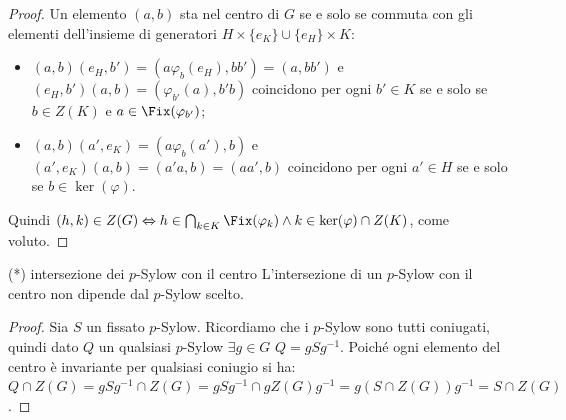 \begin{proof}
    Un elemento $(a, b)$ sta nel centro di $G$ se e solo se commuta con gli elementi dell'insieme di generatori $H \times \{e_K\} \cup \{e_H\} \times K$:
    \begin{itemize}
        \item $(a, b)(e_H, b') = (a \varphi_b(e_H), b b') = (a, b b')$ e $(e_H, b')(a, b) = (\varphi_{b'}(a), b' b)$ coincidono per ogni $b' \in K$ se e solo se $b \in Z(K)$ e $a \in \Fix(\varphi_{b'})$;
        \item $(a, b)(a', e_K) = (a \varphi_b(a'), b)$ e $(a', e_K)(a, b) = (a' a, b) = (a a', b)$ coincidono per ogni $a' \in H$ se e solo se $b \in \ker(\varphi)$.
    \end{itemize}
    Quindi $(h,k) \in Z(G) \Leftrightarrow h \in \bigcap_{k \in K} \Fix(\varphi_k) \land k \in \ker(\varphi) \cap Z(K)$, come voluto.
\end{proof}
\begin{proposition}{(*) intersezione dei $p$-Sylow con il centro}
    L'intersezione di un $p$-Sylow con il centro non dipende dal $p$-Sylow scelto.
\end{proposition}
\begin{proof}
    Sia $S$ un fissato $p$-Sylow. Ricordiamo che i $p$-Sylow sono tutti coniugati, quindi dato $Q$ un qualsiasi $p$-Sylow $\exists g \in G$ $Q = gSg^{-1}$. Poiché ogni elemento del centro è invariante per qualsiasi coniugio si ha: $Q \cap Z(G) = gSg^{-1} \cap Z(G) = gSg^{-1} \cap gZ(G)g^{-1} = g(S \cap Z(G))g^{-1} = S \cap Z(G)$. 
\end{proof} 

